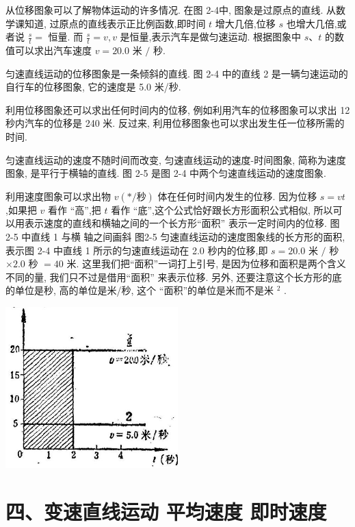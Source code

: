 \documentclass[10pt]{article}
\begin{document}
从位移图象可以了解物体运动的许多情况. 在图 2-4中, 图象是过原点的直线. 从数学课知道, 过原点的直线表示正比例函数,即时间 \(t\) 增大几倍,位移 \(s\) 也增大几倍,或者说 \(\frac{s}{t} =\) 恒量. 而 \(\frac{s}{t} = v,v\) 是恒量,表示汽车是做匀速运动. 根据图象中 \(s\text{、}t\) 的数值可以求出汽车速度 \(v = {20.0}\) 米 \(/\) 秒.

匀速直线运动的位移图象是一条倾斜的直线. 图 2-4 中的直线 2 是一辆匀速运动的自行车的位移图象, 它的速度是 5.0 米/秒.

利用位移图象还可以求出任何时间内的位移, 例如利用汽车的位移图象可以求出 12 秒内汽车的位移是 240 米. 反过来, 利用位移图象也可以求出发生任一位移所需的时间.

匀速直线运动的速度不随时间而改变, 匀速直线运动的速度-时间图象, 简称为速度图象, 是平行于横轴的直线. 图 2-5 是图 2-4 中两个匀速直线运动的速度图象.

利用速度图象可以求出物 \(v\left( {*/\text{秒}}\right)\) 体在任何时间内发生的位移. 因为位移 \(s = {vt}\) ,如果把 \(v\) 看作 “高”,把 \(t\) 看作 “底”,这个公式恰好跟长方形面积公式相似, 所以可以用表示速度的直线和横轴之间的一个长方形“面积” 表示一定时间内的位移. 图 2-5 中直线 1 与横 轴之间画斜 图2-5 匀速直线运动的速度图象线的长方形的面积, 表示图 2-4 中直线 1 所示的匀速直线运动在 2.0 秒内的位移,即 \(s = {20.0}\) 米 \(/\) 秒 \(\times {2.0}\) 秒 \(= {40}\) 米. 这里我们把“面积”一词打上引号, 是因为位移和面积是两个含义不同的量, 我们只不过是借用“面积” 来表示位移. 另外, 还要注意这个长方形的底的单位是秒, 高的单位是米/秒, 这个 “面积”的单位是米而不是米 \({}^{2}\) .

\begin{center}
\includegraphics[max width=0.5\textwidth]{images/01912d55-147c-70aa-b0e0-1782a122f948_62_848682.jpg}
\end{center}

\section*{四、变速直线运动 平均速度 即时速度}
\end{document}
